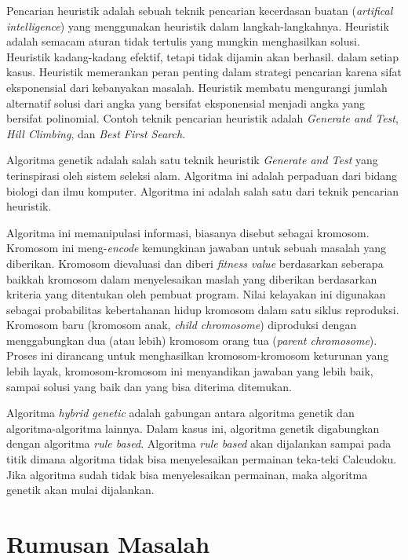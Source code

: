 Pencarian heuristik adalah sebuah teknik pencarian kecerdasan buatan (\textit{artifical intelligence}) yang menggunakan heuristik dalam langkah-langkahnya. Heuristik adalah semacam aturan tidak tertulis yang mungkin menghasilkan solusi. Heuristik kadang-kadang efektif, tetapi tidak dijamin akan berhasil. dalam setiap kasus. Heuristik memerankan peran penting dalam strategi pencarian karena sifat eksponensial dari kebanyakan masalah. Heuristik membatu mengurangi jumlah alternatif solusi dari angka yang bersifat eksponensial menjadi angka yang bersifat polinomial. Contoh teknik pencarian heuristik adalah \textit{Generate and Test}, \textit{Hill Climbing}, dan \textit{Best First Search}.

Algoritma genetik adalah salah satu teknik heuristik \textit{Generate and Test} yang terinspirasi oleh sistem seleksi alam. Algoritma ini adalah perpaduan dari bidang biologi dan ilmu komputer. Algoritma ini adalah salah satu dari teknik pencarian heuristik.

Algoritma ini memanipulasi informasi, biasanya disebut sebagai kromosom. Kromosom ini meng-\textit{encode} kemungkinan jawaban untuk sebuah masalah yang diberikan. Kromosom dievaluasi dan diberi \textit{fitness value} berdasarkan seberapa baikkah kromosom dalam menyelesaikan maslah yang diberikan berdasarkan kriteria yang ditentukan oleh pembuat program. Nilai kelayakan ini digunakan sebagai probabilitas kebertahanan hidup kromosom dalam satu siklus reproduksi. Kromosom baru (kromosom anak, \textit{child chromosome}) diproduksi dengan menggabungkan dua (atau lebih) kromosom orang tua (\textit{parent chromosome}). Proses ini dirancang untuk menghasilkan kromosom-kromosom keturunan yang lebih layak, kromosom-kromosom ini menyandikan jawaban yang lebih baik, sampai solusi yang baik dan yang bisa diterima ditemukan.

Algoritma \textit{hybrid genetic} adalah gabungan antara algoritma genetik dan algoritma-algoritma lainnya. Dalam kasus ini, algoritma genetik digabungkan dengan algoritma \textit{rule based}. Algoritma \textit{rule based} akan dijalankan sampai pada titik dimana algoritma tidak bisa menyelesaikan permainan teka-teki Calcudoku. Jika algoritma sudah tidak bisa menyelesaikan permainan, maka algoritma genetik akan mulai dijalankan.  \cite{JohannaLukasSaputra:2012}

\section{Rumusan Masalah}
\label{sec:rumusanmasalah}

